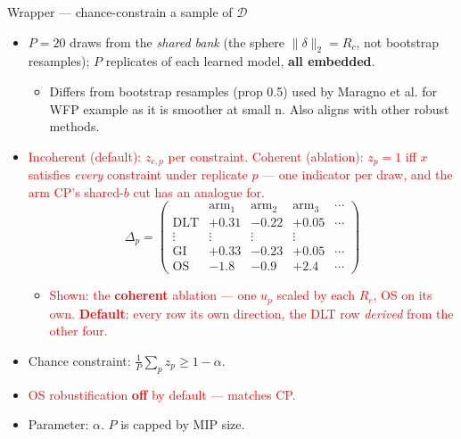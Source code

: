 \documentclass{beamer}
\newcommand{\mc}[1]{\textcolor{red}{#1}}
\begin{document}
\begin{frame}{Wrapper --- chance-constrain a sample of $\mathcal D$}
  \begin{itemize}
    \item $P=20$ draws from the \emph{shared bank} (the sphere $\lVert\delta\rVert_2=R_c$, not
      bootstrap resamples); $P$ replicates of each learned model, \textbf{all embedded}.
    \begin{itemize}
      \item Differs from bootstrap resamples (prop 0.5) used by Maragno et al. for WFP example as
        it is smoother at small n. Also aligns with other robust methods.
    \end{itemize}
    \item \mc{Incoherent (default): $z_{c,p}$ per constraint. Coherent (ablation):
      $z_p=1$ iff $x$ satisfies \emph{every} constraint under replicate $p$ --- one
      indicator per draw, and the arm CP's shared-$b$ cut has an analogue for.}
      \vspace{-0.2em}
      {\scriptsize
      \[
        \Delta_p=\left(
        \begin{array}{r|rrrc}
                       & \text{arm}_1 & \text{arm}_2 & \text{arm}_3 & \cdots\\\hline
          \text{DLT}   & +0.31 & -0.22 & +0.05 & \cdots\\
          \vdots       & \vdots & \vdots & \vdots & \\
          \text{GI}    & +0.33 & -0.23 & +0.05 & \cdots\\\hline
          \text{OS}    & -1.8\phantom{0} & -0.9\phantom{0} & +2.4\phantom{0} & \cdots
        \end{array}\right)
      \]}
      \vspace{-0.5em}
      \begin{itemize}\scriptsize
        \item \mc{Shown: the \textbf{coherent} ablation --- one $u_p$ scaled by
          each $R_c$, OS on its own. \textbf{Default}: every row its own
          direction, the DLT row \emph{derived} from the other four.}
      \end{itemize}
      \vspace{-0.3em}
    \item Chance constraint: $\tfrac1P\sum_p z_p \ge 1-\alpha$.
    \item \mc{OS robustification \textbf{off} by default --- matches CP.}
    \item Parameter: $\alpha$. $P$ is capped by MIP size.
  \end{itemize}
\end{frame}
\end{document}
